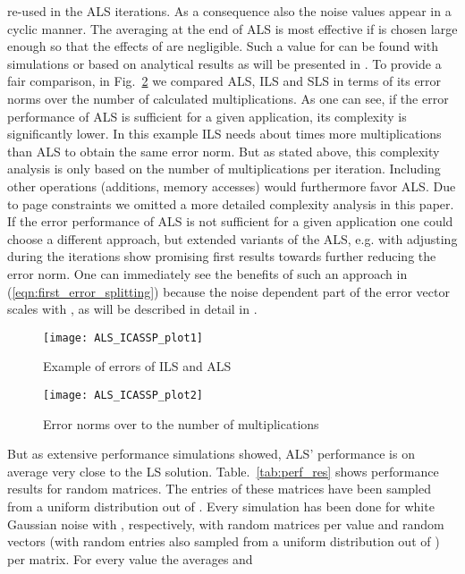\documentclass{article}
\begin{document}
re-used in the  ALS iterations. As a consequence also the noise values appear
in a cyclic manner.
The averaging at the end of ALS is most effective if  is chosen large enough
so that the effects of  are negligible. Such a value for  can be found with 
simulations or based on analytical results as will be presented in \cite{journal}.
To provide a fair comparison, in Fig.~\ref{fig:error_sin_mul} we compared ALS, ILS and SLS in 
terms of its error norms over the number of
calculated multiplications. 
As one can see, if the error performance of 
ALS is sufficient for a given application, its complexity is significantly lower. 
In this example ILS needs about  times more multiplications than ALS to obtain
the same error norm. 
But as stated above,
this complexity analysis is only based on the number of multiplications per iteration. 
Including other operations (additions, memory accesses) would furthermore favor 
ALS. Due to page constraints we omitted a more detailed complexity analysis in this paper. 
If the error performance of ALS is not sufficient for 
a given application one could choose a different approach, but extended variants of the ALS, e.g. with 
adjusting  during the iterations
show promising first results towards 
further reducing the error norm. One can immediately see the benefits of such an approach in
(\ref{eqn:first_error_splitting}) because 
the noise dependent part of the error vector scales with , as will be
described in detail in \cite{journal}. 
\begin{figure}[tb]
\begin{center}
\texttt{[image: ALS\_ICASSP\_plot1]}
\caption{ Example of errors of ILS and ALS \label{fig:error_sin} }
\end{center}
\end{figure}
\begin{figure}[tb]
\begin{center}
\texttt{[image: ALS\_ICASSP\_plot2]}
\caption{ Error norms over to the number of multiplications \label{fig:error_sin_mul} }
\end{center}
\end{figure}
But as extensive performance simulations showed, ALS' performance is on average very close to the LS solution. 
Table.~\ref{tab:perf_res} shows performance results for random  matrices. 
The entries of these matrices have been sampled from a uniform distribution out of . Every 
simulation has been done for white Gaussian noise with 
, 
respectively,
with  random matrices  per  value and  
random vectors 
(with random entries also sampled from a uniform
distribution out of ) per  matrix. For every  
value the averages  and 
\end{document}
